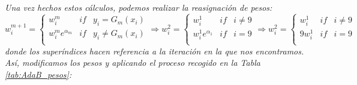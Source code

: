 \documentclass[12pt,twoside]{article}
\begin{document}
\textit{Una vez hechos estos cálculos, podemos realizar la reasignación de pesos:}
\begin{equation*}
w_i^{m+1} =
\left\{
\begin{array}{crl}
w_i^m & if & y_i = G_m(x_i) \\
w_i^m e^{\alpha_m} & if & y_i \neq G_m(x_i) \\
\end{array}
\right.
\Rightarrow
w_i^{2} =
\left\{
\begin{array}{crl}
w_i^1 & if & i \neq 9 \\
w_i^1 e^{\alpha_1} & if & i = 9 \\
\end{array}
\right.
\Rightarrow
w_i^{2} =
\left\{
\begin{array}{crl}
w_i^1 & if & i \neq 9 \\
9 w_i^1  & if & i = 9 \\
\end{array}
\right.
\end{equation*}
\noindent
\textit{donde los superíndices hacen referencia a la iteración en la que nos encontramos. Así, modificamos los pesos y aplicando el proceso recogido en la Tabla \ref{tab:AdaB_pesos}: }
\end{document}
